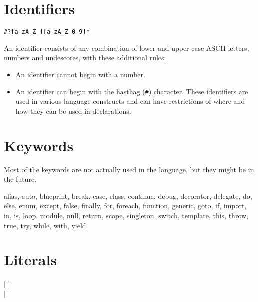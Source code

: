 \section{Identifiers}
\begin{grammar}
	 \verb|#?[a-zA-Z_][a-zA-Z_0-9]*|
\end{grammar}
An identifier consists of any combination of lower and upper case ASCII letters, numbers and undescores, with these additional rules:
\begin{itemize}
	\item An identifier cannot begin with a number.
	\item An identifier can begin with the hasthag (\verb|#|) character. These identifiers are used in various language constructs and can have restrictions of where and how they can be used in declarations.
\end{itemize}

\section{Keywords} \label{keywords}
Most of the keywords are not actually used in the language, but they might be in the future.
\begin{code}
alias, auto, blueprint, break, case, class, continue, debug, decorator, delegate, do, else, enum, except, false, finally, for, foreach, function, generic, goto, if, import, in, is, loop, module, null, return, scope, singleton, switch, template, this, throw, true, try, while, with, yield
\end{code}

\section{Literals}
\begin{grammar}
	  [  ] \\
		\grAltLn {} |  \\
		\grAltLn {} \\
	  \\
		\grAltLn {} \\
		\grAltLn {} \\
		\grAltLn {} \\
		\grAltLn {} \\
		\grAltLn {} \\
\end{grammar}

